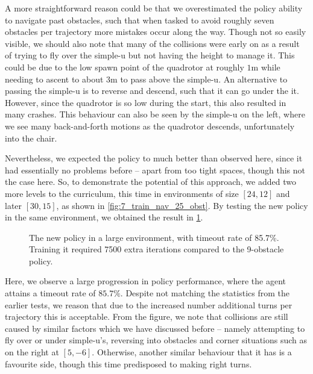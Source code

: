 A more straightforward reason could be that we overestimated the policy ability to navigate past obstacles, such that when tasked to avoid roughly seven obstacles per trajectory more mistakes occur along the way. Though not so easily visible, we should also note that many of the collisions were early on as a result of trying to fly over the simple-u but not having the height to manage it. This could be due to the low spawn point of the quadrotor at roughly $1$m while needing to ascent to about 3m to pass above the simple-u. An alternative to passing the simple-u is to reverse and descend, such that it can go under the it. However, since the quadrotor is so low during the start, this also resulted in many crashes. This behaviour can also be seen by the simple-u on the left, where we see many back-and-forth motions as the quadrotor descends, unfortunately into the chair. 

Nevertheless, we expected the policy to much better than observed here, since it had essentially no problems before -- apart from too tight spaces, though this not the case here. So, to demonstrate the potential of this approach, we added two more levels to the curriculum, this time in environments of size $[24, 12]$ and later $[30, 15]$, as shown in \cref{fig:7_train_nav_25_obst}.
By testing the new policy in the same environment, we obtained the result in \cref{fig:7_large_env_new_policy}.
\begin{figure}[htb]
    \centering
    \label{fig:7_large_env_new_policy}
    \captionsetup{justification=centering}
    \caption{The new policy in a large environment, with timeout rate of 85.7\%. Training it required 7500 extra iterations compared to the 9-obstacle policy.}
\end{figure}

Here, we observe a large progression in policy performance, where the agent attains a timeout rate of $85.7\%$. Despite not matching the statistics from the earlier tests, we reason that due to the increased number additional turns per trajectory this is acceptable. From the figure, we note that collisions are still caused by similar factors which we have discussed before -- namely attempting to fly over or under simple-u's, reversing into obstacles and corner situations such as on the right at $[5, -6]$. Otherwise, another similar behaviour that it has is a favourite side, though this time predisposed to making right turns.
